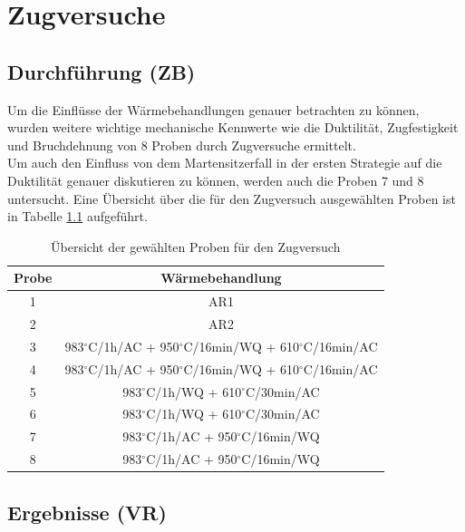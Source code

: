 \chapter{Zugversuche }

\section{Durchführung (ZB)}

Um die Einflüsse der Wärmebehandlungen genauer betrachten zu können, wurden weitere wichtige mechanische Kennwerte wie die Duktilität, Zugfestigkeit und Bruchdehnung von 8 Proben durch Zugversuche ermittelt. \\
Um auch den Einfluss von dem Martensitzerfall in der ersten Strategie auf die Duktilität genauer diskutieren zu können, werden auch die Proben 7 und 8 untersucht. Eine Übersicht über die für den Zugversuch ausgewählten Proben ist in Tabelle \ref{tab:ubersicht} aufgeführt.


\begin{table}[h]
	\centering
	\begin{tabular}{|c|c|}
		\hline 
		Probe & Wärmebehandlung \\ 
		\hline 
		1 & AR1 \\ 
		\hline 
		2 & AR2 \\ 
		\hline 
		3 &  983$^\circ$C/1h/AC + 950$^\circ$C/16min/WQ + 610$^\circ$C/16min/AC \\ 
		\hline 
		4 &  983$^\circ$C/1h/AC + 950$^\circ$C/16min/WQ + 610$^\circ$C/16min/AC \\ 
		\hline 
		5 &  983$^\circ$C/1h/WQ + 610$^\circ$C/30min/AC \\ 
		\hline 
		6 &  983$^\circ$C/1h/WQ + 610$^\circ$C/30min/AC \\ 
		\hline 
		7 &  983$^\circ$C/1h/AC + 950$^\circ$C/16min/WQ \\ 
		\hline 
		8 &  983$^\circ$C/1h/AC + 950$^\circ$C/16min/WQ \\ 
		\hline 
	\end{tabular}
    \caption{Übersicht der gewählten Proben für den Zugversuch}
	\label{tab:ubersicht} 
\end{table}

\section{Ergebnisse (VR)}

